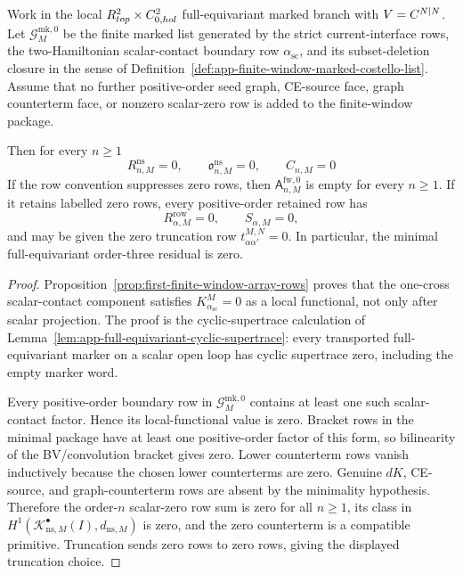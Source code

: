 \begin{thm}\label{thm:app-minimal-full-equivariant-all-order-vanishing}
  Work in the local
  \(R^2_{top}\times C^2_{0,hol}\)
  full-equivariant marked branch with \(V=C^{N|N}\).  Let
  \(\mathcal G^{\mathrm{mk},0}_M\) be the finite marked list generated by
  the strict current-interface rows, the two-Hamiltonian scalar-contact
  boundary row \(\alpha_{\mathrm{sc}}\), and its subset-deletion closure in
  the sense of
  Definition~\ref{def:app-finite-window-marked-costello-list}.  Assume that no
  further positive-order seed graph, CE-source face, graph counterterm face,
  or nonzero scalar-zero row is added to the finite-window package.

  Then for every \(n\geq1\)
  \[
    R^{\mathrm{ns}}_{n,M}=0,\qquad
    \mathfrak o^{\mathrm{ns}}_{n,M}=0,\qquad
    C_{n,M}=0
  \]
  If the row convention suppresses zero rows, then
  \(\mathsf A^{\mathrm{fw},0}_{n,M}\) is empty for every \(n\geq1\).  If it
  retains labelled zero rows, every positive-order retained row has
  \[
    R^{\mathrm{row}}_{\alpha,M}=0,\qquad
    S_{\alpha,M}=0,
  \]
  and may be given the zero truncation row
  \(t^{M,N}_{\alpha\alpha'}=0\).  In particular, the minimal
  full-equivariant order-three residual is zero.
\end{thm}

\begin{proof}
  Proposition~\ref{prop:first-finite-window-array-rows} proves that the
  one-cross scalar-contact component satisfies
  \(K^M_{\alpha_{\mathrm{sc}}}=0\) as a local functional, not only after
  scalar projection.  The proof is the cyclic-supertrace calculation of
  Lemma~\ref{lem:app-full-equivariant-cyclic-supertrace}: every transported
  full-equivariant marker on a scalar open loop has cyclic supertrace zero,
  including the empty marker word.

  Every positive-order boundary row in
  \(\mathcal G^{\mathrm{mk},0}_M\) contains at least one such
  scalar-contact factor.  Hence its local-functional value is zero.  Bracket
  rows in the minimal package have at least one positive-order factor of this
  form, so bilinearity of the BV/convolution bracket gives zero.  Lower
  counterterm rows vanish inductively because the chosen lower counterterms
  are zero.  Genuine \(dK\), CE-source, and graph-counterterm rows are absent
  by the minimality hypothesis.  Therefore the order-\(n\) scalar-zero row sum
  is zero for all \(n\geq1\), its class in
  \(H^1(\mathcal K^\bullet_{\mathrm{ns},M}(I),d_{\mathrm{ns},M})\) is zero,
  and the zero counterterm is a compatible primitive.  Truncation sends zero
  rows to zero rows, giving the displayed truncation choice.
\end{proof}

